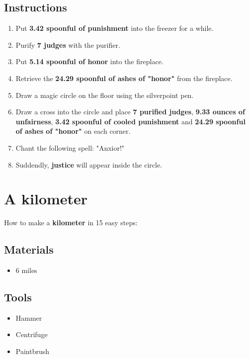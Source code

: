 \documentclass{article}
\begin{document}
\subsection{Instructions}\begin{enumerate}
\item 
Put \textbf{3.42 spoonful of punishment} into the freezer for a while.
\item 
Purify \textbf{7 judges} with the purifier.
\item 
Put \textbf{5.14 spoonful of honor} into the fireplace.
\item 
Retrieve the \textbf{24.29 spoonful of ashes of "honor"} from the fireplace.
\item 
Draw a magic circle on the floor using the silverpoint pen.
\item 
Draw a cross into the circle and place \textbf{7 purified judges}, \textbf{9.33 ounces of unfairness}, \textbf{3.42 spoonful of cooled punishment} and \textbf{24.29 spoonful of ashes of "honor"} on each corner.
\item 
Chant the following spell: "Anxior!"
\item 
Suddendly, \textbf{justice} will appear inside the circle.
\end{enumerate}
\newpage
\section{A kilometer}How to make a \textbf{kilometer} in 15 easy steps:

\subsection{Materials}\begin{itemize}
\item 
6 miles
\end{itemize}
\subsection{Tools}\begin{itemize}
\item 
Hammer
\item 
Centrifuge
\item 
Paintbrush
\end{itemize}
\end{document}
